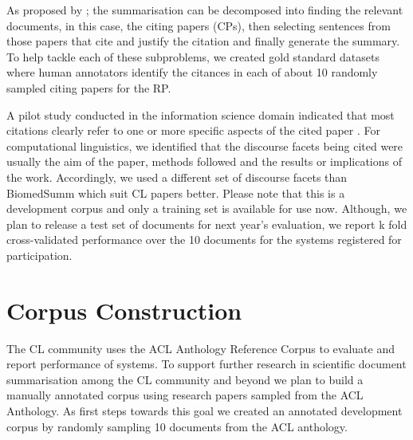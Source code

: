 \documentclass[11pt]{article}
\begin{document}
As proposed by \cite{vu2010}; \cite{hoang2010} the summarisation can be 
decomposed into finding the relevant documents, in this case, the citing 
papers (CPs), then selecting sentences from those papers that cite and 
justify the citation and finally generate the summary. To help tackle each 
of these subproblems, we created gold standard datasets where human annotators 
identify the citances in each of about 10 randomly sampled citing papers for 
the RP.


A pilot study conducted in the information science domain indicated that 
most citations clearly refer to one or more specific aspects of the cited 
paper \cite{jaidka2013}. For computational linguistics, we identified that 
the discourse facets being cited were usually the aim of the paper, methods 
followed and the results or implications of the work. Accordingly, we used a 
different set of discourse facets than BiomedSumm which suit CL papers better. 
Please note that this is a development corpus and only a training set is 
available for use now. Although, we plan to release a test set of documents 
for next year's evaluation, we report k fold cross-validated performance over 
the 10 documents for the systems registered for participation.

\section{Corpus Construction}
\label{corpus}
The CL community uses the ACL Anthology Reference Corpus \cite{bird2008} 
to evaluate and report performance of systems. To support further research 
in scientific document summarisation among the CL community and beyond we 
plan to build a manually annotated corpus using research papers sampled 
from the ACL Anthology. As first steps towards this goal we created an 
annotated development corpus by randomly sampling 10 documents from the 
ACL anthology. 
\end{document}
